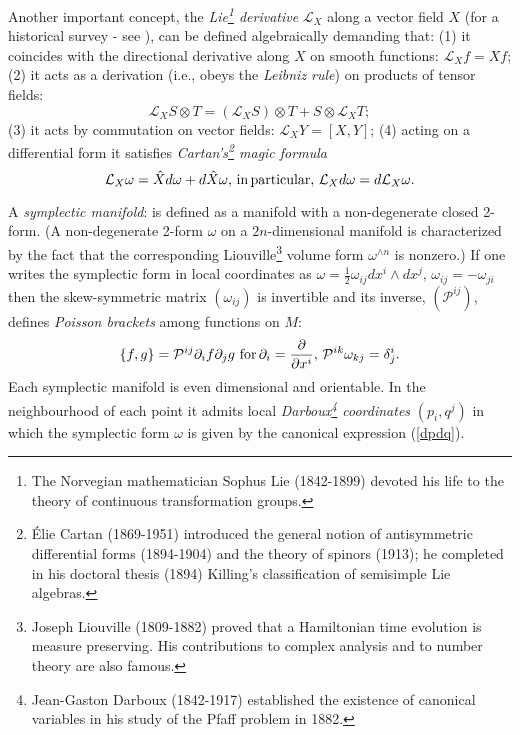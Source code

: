 \documentclass[12pt]{article}
\begin{document}
Another important concept, the {\it Lie\footnote{The Norvegian mathematician Sophus 
Lie (1842-1899) devoted his life to the theory of continuous transformation groups.}
 derivative} ${\mathcal L}_X$ along a
vector field $X$ (for a historical survey - see \cite{Tr}), can be defined
algebraically demanding that: (1) it coincides with the directional derivative
along $X$ on smooth functions: ${\mathcal L}_Xf = Xf$;
(2) it acts as a derivation (i.e., obeys the {\it Leibniz rule}) on products of
 tensor fields:
\begin{equation}
{\mathcal L}_X S\otimes T = ({\mathcal L}_X S)\otimes T +
S\otimes{\mathcal L}_X T;
\end{equation}
(3) it acts by commutation on vector fields: ${\mathcal L}_X Y = [X, Y]$;
(4) acting on a differential form it satisfies {\it Cartan's\footnote{\'Elie 
Cartan (1869-1951) introduced the general notion of antisymmetric differential 
forms (1894-1904) and the theory of spinors (1913); he completed in his 
doctoral thesis (1894) Killing's classification of semisimple Lie algebras.}  
magic formula}
\begin{equation}
{\mathcal L}_X\omega = \hat{X}d\omega + d\hat{X}\omega, \, {\rm in \,
particular}, \, {\mathcal L}_X d\omega = d{\mathcal L}_X \omega.
\end{equation}

A {\it symplectic manifold}: is defined as a manifold with a non-degenerate
closed 2-form. (A non-degenerate 2-form $\omega$ on a $2n$-dimensional manifold is characterized by the fact that 
the corresponding Liouville\footnote{Joseph Liouville (1809-1882) proved that a Hamiltonian time evolution
is measure preserving. His contributions to complex analysis and to number theory are also famous.} volume form 
$\omega^{\wedge n}$ is nonzero.) If one writes the symplectic form in local coordinates as 
$\omega = \frac{1}{2}\omega_{ij}dx^i\wedge dx^j, \, \omega_{ij} = -\omega_{ji}$ then the skew-symmetric 
matrix $(\omega_{ij})$ is invertible and its inverse, $({\mathcal P}^{ij})$, defines {\it Poisson brackets} among functions on $M$:
\begin{equation}
\label{Omega}
\{f, g\} = {\mathcal P}^{ij}\partial_i f \partial_j g \, \, {\rm for} \, \partial_i = \frac{\partial}{\partial x^i}, \, 
 {\mathcal P}^{ik}\omega_{kj} = \delta^i_j.
\end{equation}
Each symplectic manifold is even dimensional and orientable. In the neighbourhood of each point it admits local 
{\it Darboux\footnote{Jean-Gaston Darboux (1842-1917) established the existence of canonical variables in his study of the
 Pfaff problem in 1882.} coordinates} $(p_i, q^j)$ in which the symplectic form $\omega$ is given by the canonical 
expression (\ref{dpdq}). 
\end{document}
